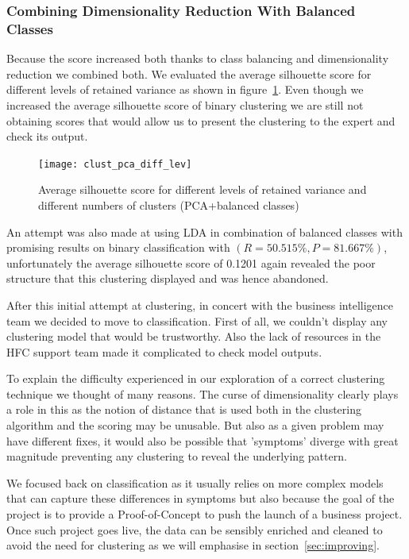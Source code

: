 \subsubsection{Combining Dimensionality Reduction With Balanced Classes}
Because the score increased both thanks to class balancing and dimensionality reduction we combined both. We evaluated the average silhouette score for different levels of retained variance as shown in figure~\ref{clust_pca_diff_lev}. Even though we increased the average silhouette score of binary clustering we are still not obtaining scores that would allow us to present the clustering to the expert and check its output. 

\begin{figure}[ht]
    \begin{center}
    \texttt{[image: clust\_pca\_diff\_lev]}
    \end{center}
    \caption{Average silhouette score for different levels of retained variance and different numbers of clusters (PCA+balanced classes)}
    \label{clust_pca_diff_lev}
\end{figure}

An attempt was also made at using LDA in combination of balanced classes with promising results on binary classification with $(R=50.515\%,P=81.667\%)$, unfortunately the average silhouette score of 0.1201 again revealed the poor structure that this clustering displayed and was hence abandoned. 

\vspace{1\baselineskip}
After this initial attempt at clustering, in concert with the business intelligence team we decided to move to classification. First of all, we couldn't display any clustering model that would be trustworthy. Also the lack of resources in the HFC support team made it complicated to check model outputs. 

To explain the difficulty experienced in our exploration of a correct clustering technique we thought of many reasons. The curse of dimensionality clearly plays a role in this as the notion of distance that is used both in the clustering algorithm and the scoring may be unusable. But also as a given problem may have different fixes, it would also be possible that 'symptoms' diverge with great magnitude preventing any clustering to reveal the underlying pattern. 

We focused back on classification as it usually relies on more complex models that can capture these differences in symptoms but also because the goal of the project is to provide a Proof-of-Concept to push the launch of a business project. Once such project goes live, the data can be sensibly enriched and cleaned to avoid the need for clustering as we will emphasise in section~\ref{sec:improving}. 

